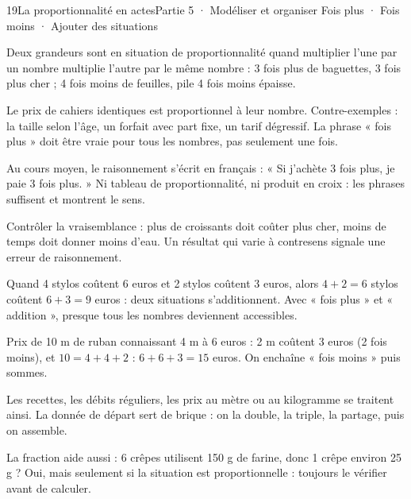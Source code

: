 \begin{ouverture}[courbe]{19}{La proportionnalité en actes}{Partie 5 · Modéliser et organiser}
{Fois plus · Fois moins · Ajouter des situations}
\end{ouverture}
\pagestyle{otMain}\essentiel\fontsize{11}{15}\selectfont
{}\label{cours-19-1}
\begin{definition}Deux grandeurs sont en situation de proportionnalité quand multiplier l’une par un nombre multiplie l’autre par le même nombre : 3 fois plus de baguettes, 3 fois plus cher ; 4 fois moins de feuilles, pile 4 fois moins épaisse.\end{definition}
\begin{exemple}Le prix de cahiers identiques est proportionnel à leur nombre. Contre-exemples : la taille selon l’âge, un forfait avec part fixe, un tarif dégressif. La phrase « fois plus » doit être vraie pour tous les nombres, pas seulement une fois.\end{exemple}
\begin{attention}Au cours moyen, le raisonnement s’écrit en français : « Si j’achète 3 fois plus, je paie 3 fois plus. » Ni tableau de proportionnalité, ni produit en croix : les phrases suffisent et montrent le sens.\end{attention}
\begin{savoirfaire}Contrôler la vraisemblance : plus de croissants doit coûter plus cher, moins de temps doit donner moins d’eau. Un résultat qui varie à contresens signale une erreur de raisonnement.\end{savoirfaire}
\clearpage
{}\label{cours-19-2}
\begin{savoirfaire}Quand 4 stylos coûtent 6 euros et 2 stylos coûtent 3 euros, alors $4+2=6$ stylos coûtent $6+3=9$ euros : deux situations s’additionnent. Avec « fois plus » et « addition », presque tous les nombres deviennent accessibles.\end{savoirfaire}
\begin{exemple}Prix de 10 m de ruban connaissant 4 m à 6 euros : 2 m coûtent 3 euros (2 fois moins), et $10=4+4+2$ : $6+6+3=15$ euros. On enchaîne « fois moins » puis sommes.\end{exemple}
\begin{propriete}Les recettes, les débits réguliers, les prix au mètre ou au kilogramme se traitent ainsi. La donnée de départ sert de brique : on la double, la triple, la partage, puis on assemble.\end{propriete}
\begin{attention}La fraction aide aussi : 6 crêpes utilisent 150 g de farine, donc 1 crêpe environ 25 g ? Oui, mais seulement si la situation est proportionnelle : toujours le vérifier avant de calculer.\end{attention}

